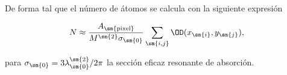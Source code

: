 De forma tal que el número de átomos se calcula con la siguiente expresión

\begin{equation}
\label{ec:numeroAtomosCCD}
N\approx\frac{A_\sm{\mathrm{pixel}}}{M^\sm{2}\sigma_\sm{0}}\sum_\sm{i,j}\OD(x_\sm{i},y_\sm{j}),
\end{equation}

para $\sigma_\sm{0}=3\lambda_\sm{0}^\sm{2}/2\pi$ la sección eficaz resonante de absorción.

%
%
%
%
%
%


%

